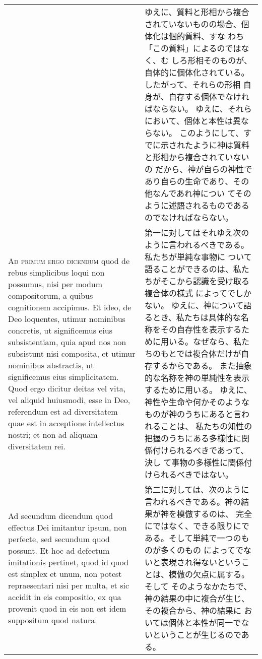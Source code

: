 \documentclass[10pt]{jsarticle} %
\begin{document}
\begin{longtable}{p{21em}p{21em}}
&

ゆえに、質料と形相から複合されていないものの場合、個体化は個的質料、すな
 わち「この質料」によるのではなく、む
 しろ形相そのものが、自体的に個体化されている。したがって、それらの形相
 自身が、自存する個体でなければならない。
ゆえに、それらにおいて、個体と本性は異ならない。
このようにして、すでに示されたように神は質料と形相から複合されていないの
 だから、神が自らの神性であり自らの生命であり、その他なんであれ神につい
 てそのように述語されるものであるのでなければならない。

\\






\textsc{Ad primum ergo dicendum} quod de rebus simplicibus loqui non
 possumus, nisi per modum compositorum, a quibus cognitionem accipimus.
Et ideo, de Deo loquentes, utimur nominibus concretis, ut significemus
 eius subsistentiam, quia apud nos non subsistunt nisi composita, et
 utimur nominibus abstractis, ut significemus eius simplicitatem.
Quod ergo dicitur deitas vel vita, vel aliquid huiusmodi, esse in Deo,
 referendum est ad diversitatem quae est in acceptione intellectus
 nostri; et non ad aliquam diversitatem rei.

&

第一に対してはそれゆえ次のように言われるべきである。私たちが単純な事物に
 ついて語ることができるのは、私たちがそこから認識を受け取る複合体の様式
 によってでしかない。
ゆえに、神について語るとき、私たちは具体的な名称をその自存性を表示するた
 めに用いる。なぜなら、私たちのもとでは複合体だけが自存するからである。
 また抽象的な名称を神の単純性を表示するために用いる。
ゆえに、神性や生命や何かそのようなものが神のうちにあると言われることは、
 私たちの知性の把握のうちにある多様性に関係付けられるべきであって、決し
 て事物の多様性に関係付けられるべきではない。

\\

Ad secundum dicendum quod effectus Dei imitantur ipsum, non perfecte,
 sed secundum quod possunt. Et hoc ad defectum imitationis pertinet,
 quod id quod est simplex et unum, non potest repraesentari nisi per
 multa, et sic accidit in eis compositio, ex qua provenit quod in eis
 non est idem suppositum quod natura.

&

第二に対しては、次のように言われるべきである。神の結果が神を模倣するのは、
 完全にではなく、できる限りにである。そして単純で一つのものが多くのもの
 によってでないと表現され得ないということは、模倣の欠点に属する。そして
 そのようなかたちで、神の結果の中に複合が生じ、その複合から、神の結果に
 おいては個体と本性が同一でないということが生じるのである。


\end{longtable}
\end{document}
